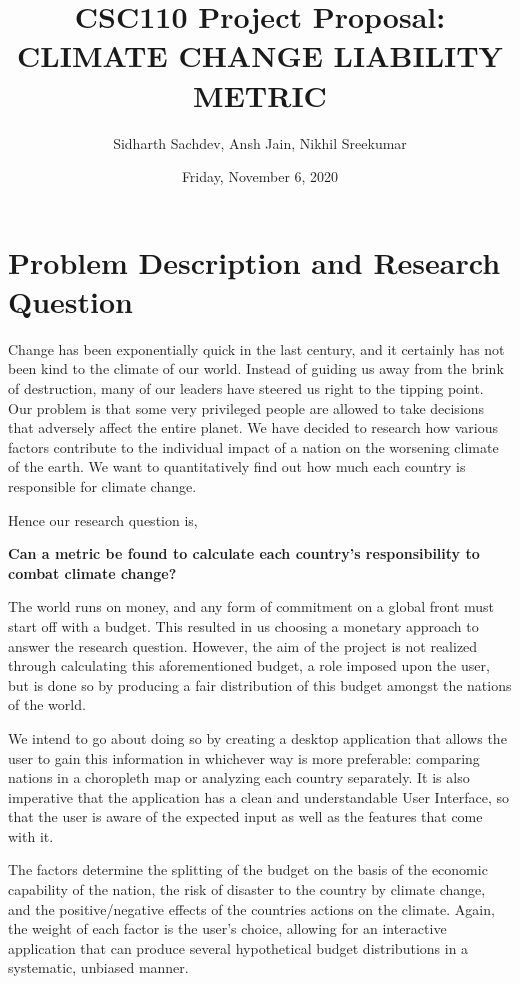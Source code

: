 \documentclass[fontsize=11pt]{article}
\title{CSC110 Project Proposal: CLIMATE CHANGE LIABILITY METRIC}
\author{Sidharth Sachdev, Ansh Jain, Nikhil Sreekumar}
\date{Friday, November 6, 2020}
\begin{document}
\maketitle

\section*{Problem Description and Research Question}

Change has been exponentially quick in the last century, and it certainly has not been kind to the climate of our world.
Instead of guiding us away from the brink of destruction, many of our leaders have steered us right to the tipping point.
Our problem is that some very privileged people are allowed to take decisions that adversely affect the entire planet.
 We have decided to research how various factors contribute to the individual impact of a nation on the worsening climate of the earth.
We want to quantitatively find out how much each country is responsible for climate change.\newline

Hence our research question is,\newline

\textbf{Can a metric be found to calculate each country's responsibility to combat climate change?} \newline

The world runs on money, and any form of commitment on a global front must start off with
a budget.
This resulted in us choosing a monetary approach to answer the research question.
However, the aim of the project is not realized through calculating this aforementioned budget, a role
imposed upon the user, but is done so by producing a fair distribution
of this budget amongst the nations of the world.\newline

We intend to go about doing so by creating a desktop application that allows the user to gain this information in
whichever way is more preferable: comparing nations in a choropleth map or analyzing each country separately.
It is also imperative that the application has a clean and understandable User Interface, so that the user is aware
of the expected input as well as the features that come with it.\newline

The factors determine the splitting of the budget on the basis of the economic capability of the nation, the risk of disaster to the
country by climate change, and the positive/negative effects of the countries actions on the climate.
Again, the weight of each factor is the user's choice, allowing for an interactive application that can produce several
hypothetical budget distributions in a systematic, unbiased manner.
\end{document}
